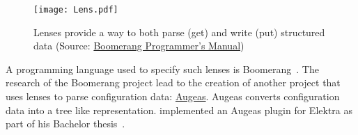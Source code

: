 \begin{figure}[H]
  \centering
    \texttt{[image: Lens.pdf]}
  \caption{Lenses provide a way to both parse (get) and write (put) structured data \newline (Source: \href{http://www.seas.upenn.edu/~harmony/manual.pdf}{Boomerang Programmer’s Manual})}
\end{figure}

A programming language used to specify such lenses is Boomerang~\cite{bohannon2008boomerang}. The research of the Boomerang project lead to the creation of another project that uses lenses to parse configuration data: \href{http://augeas.net}{Augeas}. Augeas converts configuration data into a tree like representation. \citeauthor{berlakovich2016universal} implemented an Augeas plugin for Elektra as part of his Bachelor thesis~\cite{berlakovich2016universal}.
